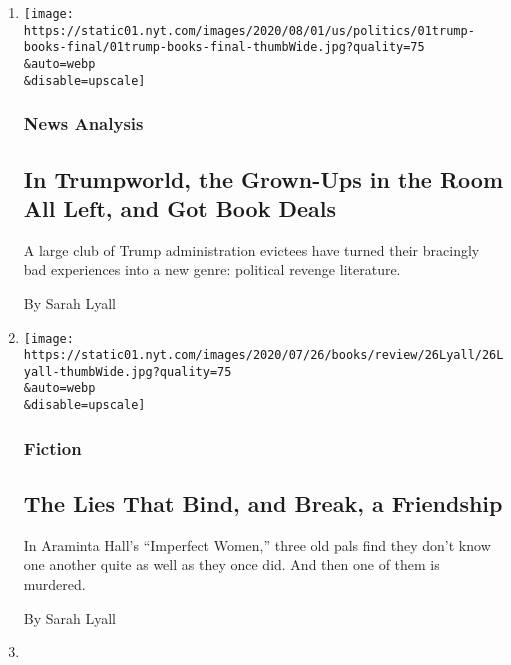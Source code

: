 \begin{enumerate}
\def\labelenumi{\arabic{enumi}.}
\item
  \href{/2020/08/01/us/politics/trump-books.html}{}

  \texttt{[image: https://static01.nyt.com/images/2020/08/01/us/politics/01trump-books-final/01trump-books-final-thumbWide.jpg?quality=75\\\&auto=webp\\\&disable=upscale]}

  \hypertarget{news-analysis}{%
  \subsubsection{News Analysis}\label{news-analysis}}

  \hypertarget{in-trumpworld-the-grown-ups-in-the-room-all-left-and-got-book-deals}{%
  \subsection{In Trumpworld, the Grown-Ups in the Room All Left, and Got
  Book
  Deals}\label{in-trumpworld-the-grown-ups-in-the-room-all-left-and-got-book-deals}}

  A large club of Trump administration evictees have turned their
  bracingly bad experiences into a new genre: political revenge
  literature.

  By Sarah Lyall
\item
  \href{/2020/07/24/books/review/araminta-hall-imperfect-women.html}{}

  \texttt{[image: https://static01.nyt.com/images/2020/07/26/books/review/26Lyall/26Lyall-thumbWide.jpg?quality=75\\\&auto=webp\\\&disable=upscale]}

  \hypertarget{fiction}{%
  \subsubsection{Fiction}\label{fiction}}

  \hypertarget{the-lies-that-bind-and-break-a-friendship}{%
  \subsection{The Lies That Bind, and Break, a
  Friendship}\label{the-lies-that-bind-and-break-a-friendship}}

  In Araminta Hall's ``Imperfect Women,'' three old pals find they don't
  know one another quite as well as they once did. And then one of them
  is murdered.

  By Sarah Lyall
\item
  \href{/2020/06/27/books/lacy-crawford-notes-on-a-silencing.html}{}


\end{enumerate}
